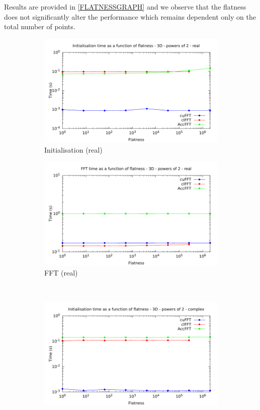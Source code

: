 \documentclass[12pt, a4paper]{article}
\begin{document}
Results are provided in \ref{FLATNESSGRAPH} and we observe that the
flatness does not significantly alter the performance which remains
dependent only on the total number of points.

\begin{figure}[htb]
\captionsetup{width=0.8\linewidth}
\centering
\begin{subfigure}{.5\textwidth}
\centering
\includegraphics[width=.9\linewidth]{graphs/flatness-r-init.pdf}
\caption{Initialisation (real)}
\label{FLAT1DRI}
\end{subfigure}%
\begin{subfigure}{.5\textwidth}
\centering
\includegraphics[width=.9\linewidth]{graphs/flatness-r-exec.pdf}
\caption{FFT (real)}
\label{FLAT1DRE}
\end{subfigure}\\
\begin{subfigure}{.5\textwidth}
\centering
\includegraphics[width=.9\linewidth]{graphs/flatness-c-init.pdf}

\end{subfigure}
\end{figure}
\end{document}
